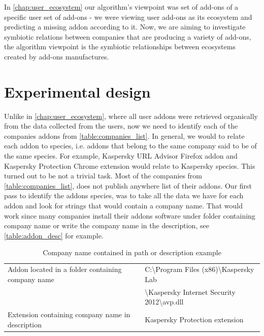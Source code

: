 \documentclass[11pt,oneside]{book}
\let\Oldsection\section
\renewcommand{\section}{\FloatBarrier\Oldsection}
\begin{document}

In \autoref{chap:user_ecosystem} our algorithm's viewpoint was set of add-ons of a specific user set of add-ons - we were viewing user add-ons as its ecosystem and predicting a missing addon according to it. Now, we are aiming to investigate symbiotic relations between companies that are producing a variety of add-ons, the algorithm viewpoint is the symbiotic relationships between ecosystems created by add-ons manufactures.
\section{Experimental design}
Unlike in \autoref{chap:user_ecosystem}, where all user addons were retrieved organically from the data collected from the users, now we need to identify each of the companies addons from \autoref{table:companies_list}. In general, we would to relate each addon to species, i.e. addons that belong to the same company said to be of the same species. For example, Kaspersky URL Advisor Firefox addon and Kaspersky Protection Chrome extension would relate to Kaspersky species. This turned out to be not a trivial task. Most of the companies from \autoref{table:companies_list}, does not publish anywhere list of their addons. Our first pass to identify the addons species, was to take all the data we have for each addon and look for strings that would contain a company name. That would work since many companies install their addons software under folder containing company name or write the company name in the description, see \autoref{table:addon_desc} for example.

\begin{table}[h]
\centering
\caption{Company name contained in path or description example}
\label{table:addon_desc}
\begin{tabular}{@{}|l|l|@{}}
\toprule
Addon located in a folder containing company name & C:\textbackslash{Program Files (x86)}\textbackslash{Kaspersky Lab}\\ & \textbackslash{Kaspersky Internet Security 2012}\textbackslash{avp.dll} \\ \midrule
Extension containing company name in description & Kaspersky Protection extension \\ \bottomrule
\end{tabular}
\end{table}
\end{document}

